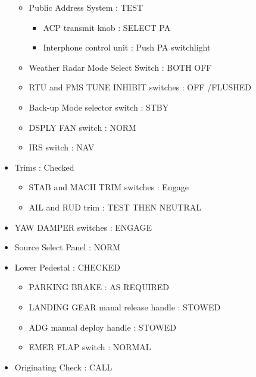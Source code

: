 \begin{itemize}
\begin{itemize}
\item Public Address System : TEST

\begin{itemize}
\item ACP transmit knob : SELECT PA

\item Interphone control unit : Push PA switchlight

\end{itemize}

\item Weather Radar Mode Select Switch : BOTH OFF

\item RTU and FMS TUNE INHIBIT switches : OFF \slash  FLUSHED

\item Back-up Mode selector switch : STBY

\item DSPLY FAN switch : NORM

\item IRS switch : NAV

\end{itemize}

\item Trims : Checked

\begin{itemize}
\item STAB and MACH TRIM switches : Engage

\item AIL and RUD trim : TEST THEN NEUTRAL

\end{itemize}

\item YAW DAMPER switches : ENGAGE

\item Source Select Panel : NORM

\item Lower Pedestal : CHECKED

\begin{itemize}
\item PARKING BRAKE : AS REQUIRED

\item LANDING GEAR manal release handle : STOWED

\item ADG manual deploy handle : STOWED

\item EMER FLAP switch : NORMAL

\end{itemize}

\item Originating Check : CALL

\end{itemize}


